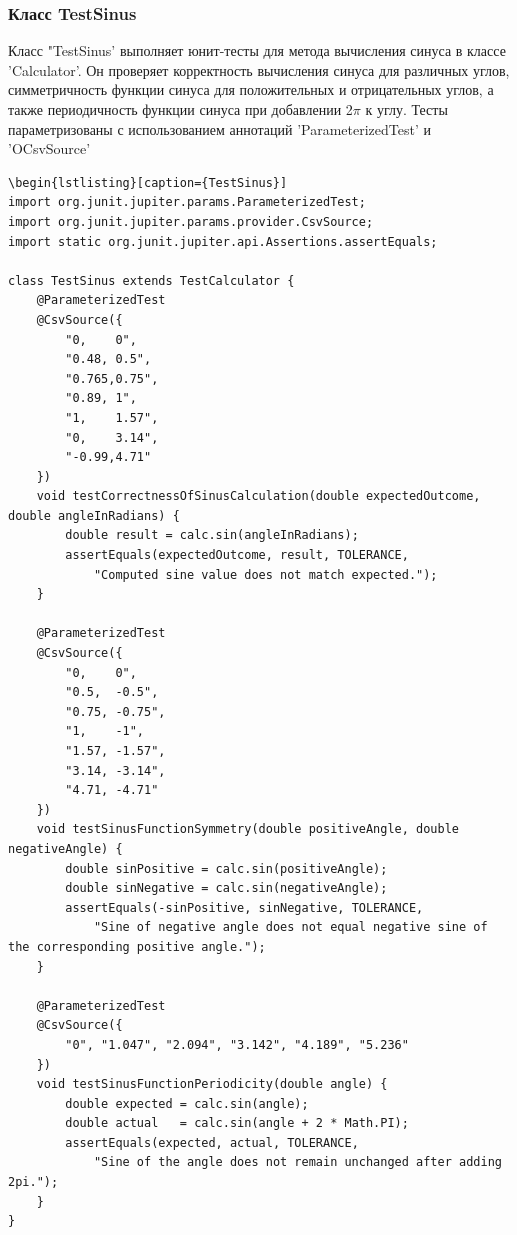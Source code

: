 \documentclass[areasetadvanced]{scrartcl}
\begin{document}
\subsubsection{Класс TestSinus}
Класс "TestSinus' выполняет юнит-тесты для метода вычисления синуса в классе 'Calculator'. Он проверяет корректность вычисления синуса для различных углов, симметричность функции синуса для положительных и отрицательных углов, а также периодичность функции синуса при добавлении 2$\pi$ к углу.
Тесты параметризованы с использованием аннотаций 'ParameterizedTest' и 'OCsvSource'
\begin{lstlisting}[caption={Класс TestSinus}]
\begin{lstlisting}[caption={TestSinus}]
import org.junit.jupiter.params.ParameterizedTest;
import org.junit.jupiter.params.provider.CsvSource;
import static org.junit.jupiter.api.Assertions.assertEquals;

class TestSinus extends TestCalculator {
	@ParameterizedTest
    @CsvSource({
        "0,    0",
        "0.48, 0.5",
        "0.765,0.75",
        "0.89, 1",
        "1,    1.57",
        "0,    3.14",
        "-0.99,4.71"
    })
    void testCorrectnessOfSinusCalculation(double expectedOutcome, double angleInRadians) {
        double result = calc.sin(angleInRadians);
        assertEquals(expectedOutcome, result, TOLERANCE,
            "Computed sine value does not match expected.");
    }

    @ParameterizedTest
    @CsvSource({
        "0,    0",
        "0.5,  -0.5",
        "0.75, -0.75",
        "1,    -1",
        "1.57, -1.57",
        "3.14, -3.14",
        "4.71, -4.71"
    })
    void testSinusFunctionSymmetry(double positiveAngle, double negativeAngle) {
        double sinPositive = calc.sin(positiveAngle);
        double sinNegative = calc.sin(negativeAngle);
        assertEquals(-sinPositive, sinNegative, TOLERANCE,
            "Sine of negative angle does not equal negative sine of the corresponding positive angle.");
    }

    @ParameterizedTest
    @CsvSource({
        "0", "1.047", "2.094", "3.142", "4.189", "5.236"
    })
    void testSinusFunctionPeriodicity(double angle) {
        double expected = calc.sin(angle);
        double actual   = calc.sin(angle + 2 * Math.PI);
        assertEquals(expected, actual, TOLERANCE,
            "Sine of the angle does not remain unchanged after adding 2pi.");
    }
}
\end{lstlisting}
\end{document}
